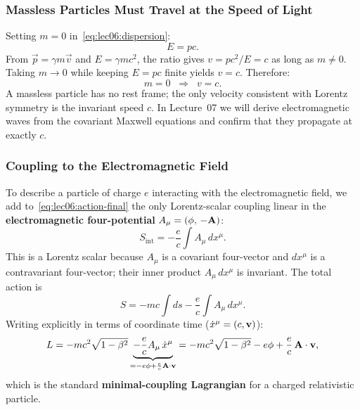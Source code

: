 \subsubsection*{Massless Particles Must Travel at the Speed of Light}

Setting $m = 0$ in~\eqref{eq:lec06:dispersion}:
\begin{equation}\label{eq:lec06:massless}
    E = pc .
\end{equation}
From $\vec{p} = \gamma m \vec{v}$ and $E = \gamma mc^2$, the ratio gives
$v = pc^2/E = c$ as long as $m\neq 0$.  Taking $m\to 0$ while keeping
$E = pc$ finite yields $v = c$.  Therefore:
\begin{equation}\label{eq:lec06:massless-speed}
    \boxed{m = 0 \;\;\Longrightarrow\;\; v = c .}
\end{equation}
A massless particle has no rest frame; the only velocity consistent with
Lorentz symmetry is the invariant speed $c$.  In Lecture~07 we will derive
electromagnetic waves from the covariant Maxwell equations and confirm that
they propagate at exactly $c$.

\subsubsection*{Coupling to the Electromagnetic Field}

To describe a particle of charge $e$ interacting with the electromagnetic
field, we add to~\eqref{eq:lec06:action-final} the only Lorentz-scalar
coupling linear in the \textbf{electromagnetic four-potential}
$A_\mu = (\phi,\,-\mathbf{A})$:
\begin{equation}\label{eq:lec06:interaction}
    S_{\mathrm{int}} = -\frac{e}{c}\int A_\mu\,dx^\mu .
\end{equation}
This is a Lorentz scalar because $A_\mu$ is a covariant four-vector and
$dx^\mu$ is a contravariant four-vector; their inner product $A_\mu\,dx^\mu$
is invariant.  The total action is
\begin{equation}\label{eq:lec06:total-action}
    S = -mc\int ds - \frac{e}{c}\int A_\mu\,dx^\mu .
\end{equation}
Writing explicitly in terms of coordinate time ($\dot{x}^\mu = (c,\mathbf{v})$):
\begin{equation}\label{eq:lec06:lagrangian-em}
    L = -mc^2\sqrt{1-\beta^2}
        \underbrace{-\frac{e}{c}A_\mu\,\dot{x}^\mu}_{= -e\phi + \frac{e}{c}\mathbf{A}\cdot\mathbf{v}}
      = -mc^2\sqrt{1-\beta^2} - e\phi + \frac{e}{c}\,\mathbf{A}\cdot\mathbf{v} ,
\end{equation}
which is the standard \textbf{minimal-coupling Lagrangian} for a charged
relativistic particle.

